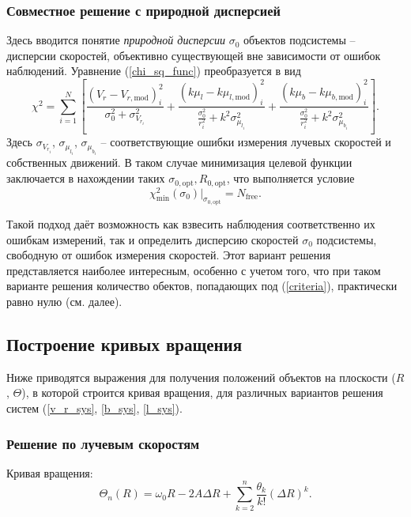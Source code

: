 \documentclass{matmex-diploma-custom}
\begin{document}
\subsubsection{Совместное решение с природной дисперсией} \label{sigma_0_mode}
Здесь вводится понятие \textit{природной дисперсии} $\sigma_0$ объектов подсистемы -- дисперсии скоростей, объективно существующей вне зависимости от ошибок наблюдений. Уравнение (\ref{chi_sq_func}) преобразуется в вид 
\begin{equation} \label{chi_sq_func}
        \chi^2 = \sum^N_{i = 1} \left[ \frac{\left( V_r - V_{r, \mathrm{mod}} \right)^2_i}{\sigma_0^2 + \sigma^2_{V_{r_i}}} + \frac{\left(k \mu_l - k\mu_{l, \mathrm{mod}} \right)^2_i}{\frac{\sigma_0^2}{r_i^2} + k^2\sigma^2_{\mu_{l_i}}} + \frac{\left(k \mu_b - k\mu_{b, \mathrm{mod}} \right)^2_i}{\frac{\sigma_0^2}{r_i^2} + k^2\sigma^2_{\mu_{b_i}}} \right].
\end{equation}
Здесь $\sigma_{V_{r_i}}$, $\sigma_{\mu_{l_i}}$, $\sigma_{\mu_{b_i}}$ -- соответствующие ошибки измерения лучевых скоростей и собственных движений.
В таком случае минимизация целевой функции заключается в нахождении таких $\sigma_{0, \mathrm{opt}}, R_{0, \mathrm{opt}}$, что выполняется условие
\begin{equation}
        \chi^2_{\mathrm{min}}(\sigma_0) |_{\sigma_{0, \mathrm{opt}}} = N_{\mathrm{free}}.
\end{equation}

\par Такой подход даёт возможность как взвесить наблюдения соответственно их ошибкам измерений, так и определить дисперсию скоростей $\sigma_0$ подсистемы, свободную от ошибок измерения скоростей. Этот вариант решения представляется наиболее интересным, особенно с учетом того, что при таком варианте решения количество обектов, попадающих под (\ref{criteria}), практически равно нулю (см. далее).

\subsection{Построение кривых вращения}
Ниже приводятся выражения для получения положений объектов на плоскости ($R$, $\Theta$), в которой строится кривая вращения, для различных вариантов решения систем (\ref{v_r_sys}, \ref{b_sys}, \ref{l_sys}).
\subsubsection{Решение по лучевым скоростям}
Кривая вращения:
\begin{equation} \label{curve_mod_vr}
        \Theta_n(R) = \omega_0 R - 2A\Delta R + \sum^n_{k = 2} \frac{\theta_k}{k!} \left( \Delta R \right)^k .
\end{equation}
\end{document}
